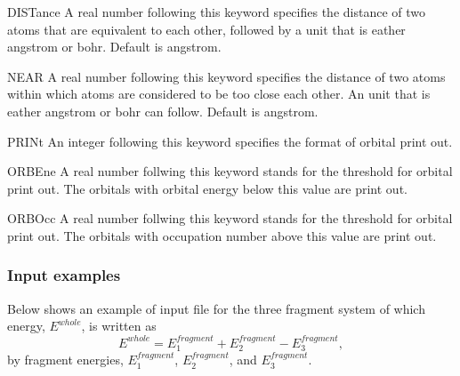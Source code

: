 \begin{keywordlist}
\item[DISTance]
A real number following this keyword specifies the distance
of two atoms that are equivalent to each other, followed by a unit that
is eather angstrom or bohr.
Default is angstrom.
\item[NEAR]
A real number following this keyword specifies the distance
of two atoms within which atoms are considered to be too close each other.
An unit that is eather angstrom or bohr can follow.
Default is angstrom.
\item[PRINt]
An integer following this keyword specifies the format of orbital print out.
\item[ORBEne]
A real number follwing this keyword stands for the threshold for orbital print
out.
The orbitals with orbital energy below this value are print out.
\item[ORBOcc]
A real number follwing this keyword stands for the threshold for orbital print
out.
The orbitals with occupation number above this value are print out.
\end{keywordlist}

\subsubsection{Input examples}

Below shows an example of input file for the three fragment system of which
energy, $E^{whole}$, is written as
\[
   E^{whole}= E_1^{fragment} + E_2^{fragment} - E_3^{fragment},
\]
by fragment energies, $E_1^{fragment}$, $E_2^{fragment}$, and $E_3^{fragment}$.

